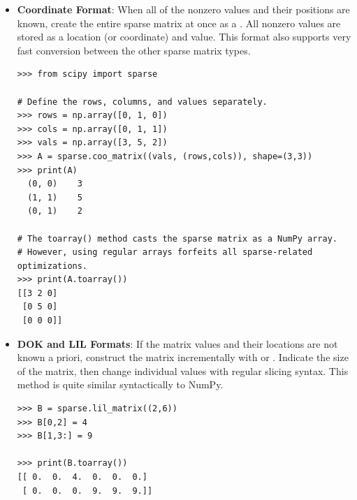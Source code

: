 \begin{itemize} %

\item \textbf{Coordinate Format}:
When all of the nonzero values and their positions are known, create the entire sparse matrix at once as a .
All nonzero values are stored as a location (or coordinate) and value.
This format also supports very fast conversion between the other sparse matrix types.

\begin{lstlisting}
>>> from scipy import sparse

# Define the rows, columns, and values separately.
>>> rows = np.array([0, 1, 0])
>>> cols = np.array([0, 1, 1])
>>> vals = np.array([3, 5, 2])
>>> A = sparse.coo_matrix((vals, (rows,cols)), shape=(3,3))
>>> print(A)
  (0, 0)    3
  (1, 1)    5
  (0, 1)    2

# The toarray() method casts the sparse matrix as a NumPy array.
# However, using regular arrays forfeits all sparse-related optimizations.
>>> print(A.toarray())
[[3 2 0]
 [0 5 0]
 [0 0 0]]
\end{lstlisting}

\item \textbf{DOK and LIL Formats}:
If the matrix values and their locations are not known a priori, construct the matrix incrementally with  or .
Indicate the size of the matrix, then change individual values with regular slicing syntax.
This method is quite similar syntactically to NumPy.

\begin{lstlisting}
>>> B = sparse.lil_matrix((2,6))
>>> B[0,2] = 4
>>> B[1,3:] = 9

>>> print(B.toarray())
[[ 0.  0.  4.  0.  0.  0.]
 [ 0.  0.  0.  9.  9.  9.]]
\end{lstlisting}

\end{itemize}
